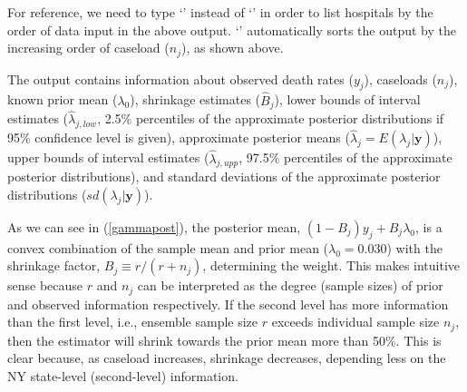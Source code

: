 \documentclass[article]{jss}
\begin{document}
For reference, we need to type `' instead of `' in order to list hospitals by the order of data input in the above output. `' automatically sorts the output by the increasing order of caseload ($n_{j}$), as shown above.


The output contains information about observed death rates ($y_{j}$), caseloads ($n_{j}$), known prior mean ($\lambda_{0}$), shrinkage estimates ($\hat{B}_{j}$), lower bounds of interval estimates ($\hat{\lambda}_{j, low}$, 2.5\% percentiles of the approximate posterior distributions if 95\% confidence level is given), approximate posterior means ($\hat{\lambda}_{j}=E(\lambda_{j}\vert \textbf{y})$), upper bounds  of interval estimates ($\hat{\lambda}_{j, upp}$, 97.5\% percentiles of the approximate posterior distributions), and standard deviations of the approximate posterior distributions ($sd(\lambda_{j}\vert \textbf{y})$).


As we can see in (\ref{gammapost}), the posterior mean, $(1-B_{j})y_{j} + B_{j}\lambda_{0}$, is a convex combination of the sample mean and prior mean ($\lambda_{0}=0.030$) with the shrinkage factor, $B_{j}\equiv r / (r + n_{j})$, determining the weight. This makes intuitive sense because $r$ and $n_{j}$ can be interpreted as the degree (sample sizes) of prior and observed information respectively. If the second level has more information than the first level, i.e., ensemble sample size $r$ exceeds individual sample size $n_{j}$, then the estimator will shrink towards the prior mean more than 50\%. This is clear because, as caseload increases, shrinkage decreases, depending less on the NY state-level (second-level) information.
\end{document}
